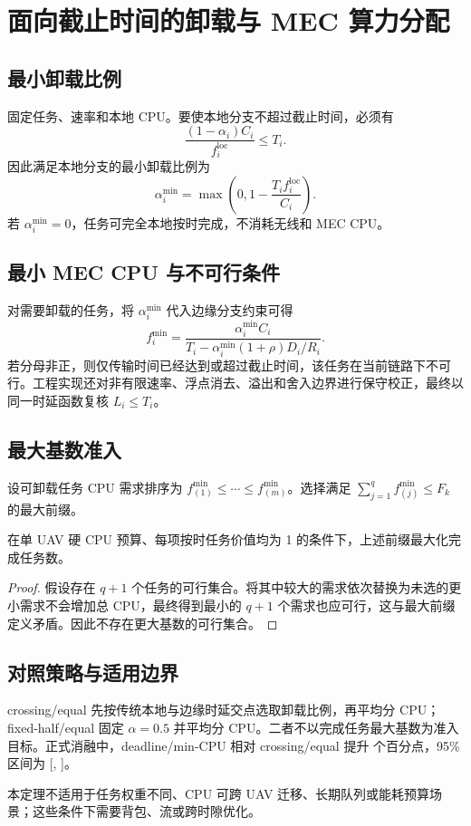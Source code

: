 \chapter{面向截止时间的卸载与 MEC 算力分配}
\section{最小卸载比例}
固定任务、速率和本地 CPU。要使本地分支不超过截止时间，必须有
\begin{equation}
\frac{(1-\alpha_i)C_i}{f_i^{\mathrm{loc}}}\le T_i.
\end{equation}
因此满足本地分支的最小卸载比例为
\begin{equation}
\alpha_i^{\min}=\max\!\left(0,1-\frac{T_i f_i^{\mathrm{loc}}}{C_i}\right).
\end{equation}
若 $\alpha_i^{\min}=0$，任务可完全本地按时完成，不消耗无线和 MEC CPU。

\section{最小 MEC CPU 与不可行条件}
对需要卸载的任务，将 $\alpha_i^{\min}$ 代入边缘分支约束可得
\begin{equation}
f_i^{\min}=\frac{\alpha_i^{\min}C_i}
{T_i-\alpha_i^{\min}(1+\rho)D_i/R_i}.
\end{equation}
若分母非正，则仅传输时间已经达到或超过截止时间，该任务在当前链路下不可行。工程实现还对非有限速率、浮点消去、溢出和舍入边界进行保守校正，最终以同一时延函数复核 $L_i\le T_i$。

\section{最大基数准入}
设可卸载任务 CPU 需求排序为
$f_{(1)}^{\min}\le\cdots\le f_{(m)}^{\min}$。选择满足
$\sum_{j=1}^{q}f_{(j)}^{\min}\le F_k$ 的最大前缀。

\begin{theorem}
在单 UAV 硬 CPU 预算、每项按时任务价值均为 1 的条件下，上述前缀最大化完成任务数。
\end{theorem}
\begin{proof}
假设存在 $q+1$ 个任务的可行集合。将其中较大的需求依次替换为未选的更小需求不会增加总 CPU，最终得到最小的 $q+1$ 个需求也应可行，这与最大前缀定义矛盾。因此不存在更大基数的可行集合。
\end{proof}

\section{对照策略与适用边界}
crossing/equal 先按传统本地与边缘时延交点选取卸载比例，再平均分 CPU；fixed-half/equal 固定 $\alpha=0.5$ 并平均分 CPU。二者不以完成任务最大基数为准入目标。正式消融中，deadline/min-CPU 相对 crossing/equal 提升 \InnovationTwoGainPP{} 个百分点，95\% 区间为 [\InnovationTwoCILowPP{}, \InnovationTwoCIHighPP{}]。

本定理不适用于任务权重不同、CPU 可跨 UAV 迁移、长期队列或能耗预算场景；这些条件下需要背包、流或跨时隙优化。
